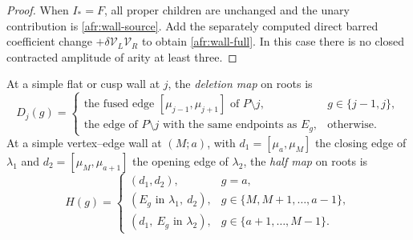 \begin{proof}
When $I_*=F$, all proper children are unchanged and the unary
contribution is \eqref{afr:wall-source}.  Add the separately computed
direct barred coefficient change $+\delta \mathcal V_L\mathcal V_R$ to obtain
\eqref{afr:wall-full}.  In this case there is no closed contracted
amplitude of arity at least three.
\end{proof}

\begin{definition}\label{def:induced-roots}\leanok
At a simple flat or cusp wall at $j$, the \emph{deletion map} on roots is
\[
D_j(g)=\begin{cases}\text{the fused edge }[\mu_{j-1},\mu_{j+1}]\text{ of }P\setminus j,& g\in\{j-1,j\},\\
\text{the edge of }P\setminus j\text{ with the same endpoints as }E_g,&\text{otherwise.}\end{cases}
\]
At a simple vertex--edge wall at $(M;a)$, with $d_1=[\mu_a,\mu_M]$ the
closing edge of $\lambda_1$ and $d_2=[\mu_M,\mu_{a+1}]$ the opening edge of
$\lambda_2$, the \emph{half map} on roots is
\[
H(g)=\begin{cases}(d_1,d_2),&g=a,\\
(E_g\text{ in }\lambda_1,\ d_2),&g\in\{M,M+1,\ldots,a-1\},\\
(d_1,\ E_g\text{ in }\lambda_2),&g\in\{a+1,\ldots,M-1\}.\end{cases}
\]
\end{definition}

